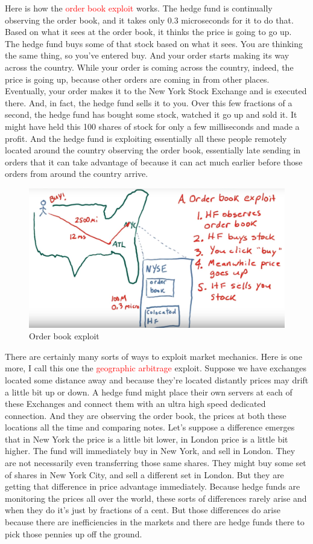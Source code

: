 \documentclass[12pt]{article}
\begin{document}
Here is how the \textcolor{red}{order book exploit} works. The hedge fund is continually observing the order book, and it takes only 0.3 microseconds for it to do that. Based on what it sees at the order book, it thinks the price is going to go up. The hedge fund buys some of that stock based on what it sees. You are thinking the same thing, so you've entered buy. And your order starts making its way across the country. While your order is coming across the country, indeed, the price is going up, because other orders are coming in from other places. Eventually, your order makes it to the New York Stock Exchange and is executed there. And, in fact, the hedge fund sells it to you. Over this few fractions of a second, the hedge fund has bought some stock, watched it go up and sold it. It might have held this 100 shares of stock for only a few milliseconds and made a profit. And the hedge fund is exploiting essentially all these people remotely located around the country observing the order book, essentially late sending in orders that it can take advantage of because it can act much earlier before those orders from around the country arrive. \\ [8pt]
\begin{figure}[!ht]
\centering
\includegraphics[scale=0.3]{fig/fig31}
\caption{Order book exploit}
\end{figure}
\noindent
There are certainly many sorts of ways to exploit market mechanics. Here is one more, I call this one the \textcolor{red}{geographic arbitrage} exploit. Suppose we have exchanges located some distance away and because they're located distantly prices may drift a little bit up or down. A hedge fund might place their own servers at each of these Exchanges and connect them with an ultra high speed dedicated connection. And they are observing the order book, the prices at both these locations all the time and comparing notes. Let's suppose a difference emerges that in New York the price is a little bit lower, in London price is a little bit higher. The fund will immediately buy in New York, and sell in London. They are not necessarily even transferring those same shares. They might buy some set of shares in New York City, and sell a different set in London. But they are getting that difference in price advantage immediately. Because hedge funds are monitoring the prices all over the world, these sorts of differences rarely arise and when they do it's just by fractions of a cent. But those differences do arise because there are inefficiencies in the markets and there are hedge funds there to pick those pennies up off the ground. 
\end{document}
